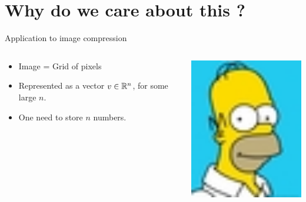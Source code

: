 \documentclass{beamer}
\begin{document}
\section{Why do we care about this ?}
\begin{frame}{Application to image compression}
	\begin{columns}
		\begin{column}{0.5\textwidth}
			\begin{itemize}
				\item Image = Grid of pixels
				\item Represented as a vector $v \in \mathbb{R}^n$, for some large $n$.
				\item One need to store $n$ numbers.
			\end{itemize}
		\end{column}
		\begin{column}{0.5\textwidth}
			\begin{center}
				\begin{image}
					\includegraphics[width=5.5cm]{./homer1.jpg}
					\caption{$n=44 \times 55 = 2420$}
				\end{image}
			\end{center}
		\end{column}
	\end{columns}
\end{frame}
\end{document}
